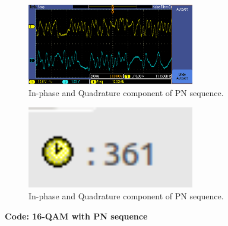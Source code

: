 \documentclass{article}
\begin{document}
\begin{figure}[h]
  \begin{center}
    \includegraphics[width=0.65\textwidth]{img/task_e_oscilloscope.png}
    \caption{In-phase and Quadrature component of PN sequence.}
  \end{center}
\end{figure}

\begin{figure}[h]
  \begin{center}
    \includegraphics[width=0.65\textwidth]{img/task_e_profile.png}
    \caption{In-phase and Quadrature component of PN sequence.}
  \end{center}
\end{figure}

\pagebreak
\textbf{Code: 16-QAM with PN sequence}
\end{document}
